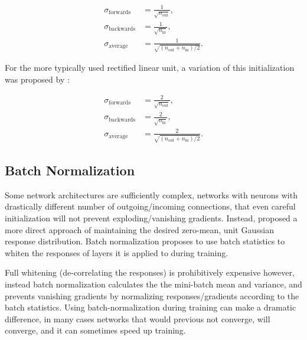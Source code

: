\documentclass[thesis]{subfiles}
\begin{document}
\begin{equation}
\begin{aligned}
	\sigma_{\textrm{forwards}} &= \frac{1}{\sqrt{n_{\text{out}}}},\\
	\sigma_{\textrm{backwards}} &= \frac{1}{\sqrt{n_{\text{in}}}},\\
	\sigma_{\textrm{average}} &= \frac{1}{\sqrt{(n_{\text{out}} + n_{\text{in}})/2}}.
\end{aligned}
\end{equation}

For the more typically used rectified linear unit, a variation of this initialization was proposed by \citet{He2015b}:

\begin{equation}
\begin{aligned}
	\sigma_{\textrm{forwards}} &= \frac{2}{\sqrt{n_{\text{out}}}},\\
	\sigma_{\textrm{backwards}} &= \frac{2}{\sqrt{n_{\text{in}}}},\\
	\sigma_{\textrm{average}} &= \frac{2}{\sqrt{(n_{\text{out}} + n_{\text{in}})/2}}.
\end{aligned}
\end{equation}

\subsection{Batch Normalization}
Some network architectures are sufficiently complex, \eg{}networks with neurons with drastically different number of outgoing/incoming connections, that even careful initialization will not prevent exploding/vanishing gradients. Instead, \citet{Ioffe2015} proposed a more direct approach of maintaining the desired zero-mean, unit Gaussian response distribution. Batch normalization proposes to use batch statistics to whiten the responses of layers it is applied to during training.

Full whitening (\ie{}de-correlating the responses) is prohibitively expensive however, instead batch normalization calculates the the mini-batch mean and variance, and prevents vanishing gradients by normalizing responses/gradients according to the batch statistics. Using batch-normalization during training can make a dramatic difference, in many cases networks that would previous not converge, will converge, and it can sometimes speed up training.
\end{document}
